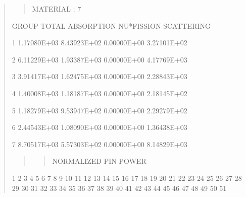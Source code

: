 \documentclass[letterpaper,10pt,english]{sphinxmanual}
\begin{document}
\begin{quote}
\begin{quote}
MATERIAL :   7
\end{quote}

\begin{DUlineblock}{0em}
\item[] GROUP           TOTAL        ABSORPTION      NU*FISSION      SCATTERING        \textbar{}
\end{DUlineblock}

\begin{DUlineblock}{0em}
\item[] 1          1.17080E+03     8.43923E+02     0.00000E+00     3.27101E+02      \textbar{}
\item[] 2          6.11229E+03     1.93387E+03     0.00000E+00     4.17769E+03      \textbar{}
\item[] 3          3.91417E+03     1.62475E+03     0.00000E+00     2.28843E+03      \textbar{}
\item[] 4          1.40008E+03     1.18187E+03     0.00000E+00     2.18145E+02      \textbar{}
\item[] 5          1.18279E+03     9.53947E+02     0.00000E+00     2.29279E+02      \textbar{}
\item[] 6          2.44543E+03     1.08090E+03     0.00000E+00     1.36438E+03      \textbar{}
\item[] 7          8.70517E+03     5.57303E+02     0.00000E+00     8.14829E+03      \textbar{}
\end{DUlineblock}
\begin{quote}
\begin{quote}

NORMALIZED PIN POWER
\end{quote}
\end{quote}

\begin{DUlineblock}{0em}
\item[] 1        2        3        4        5        6        7        8        9           10           11           12           13           14           15           16           17           18           19           20           21           22           23           24           25           26           27           28           29           30           31           32           33           34           35           36           37           38           39           40           41           42           43           44           45           46           47           48           49           50           51
\end{DUlineblock}


\end{quote}
\end{document}
